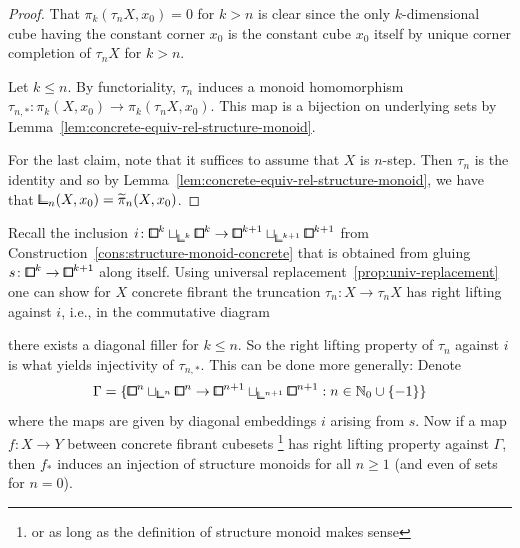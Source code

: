 \begin{proof}
That $\pi_k(\tau_n X,x_0) = 0$ for $k>n$ is clear since the only $k$-dimensional cube having the constant corner $x_0$ is the constant cube $x_0$ itself by unique corner completion of $\tau_n X$ for $k>n$.

Let $k\leq n$.
By functoriality, $\tau_n$ induces a monoid homomorphism $\tau_{n,\ast}\colon\pi_k(X,x_0)\to\pi_k(\tau_n X,x_0)$.
This map is a bijection on underlying sets by Lemma~\ref{lem:concrete-equiv-rel-structure-monoid}.

For the last claim, note that it suffices to assume that $X$ is $n$-step.
Then $\tau_n$ is the identity and so by Lemma~\ref{lem:concrete-equiv-rel-structure-monoid},
we have that $\bbcor_n(X,x_0) = \tilde{\pi}_n(X,x_0)$.
\end{proof}

\begin{remark}\label{rem:nil-cofibrations}
Recall the inclusion
$i\colon{\bbox}^k\sqcup_{{\bbcor}^k}{\bbox}^k\to{\bbox}^{k+1}\sqcup_{{\bbcor}^{k+1}}{\bbox}^{k+1}$
from Construction~\ref{cons:structure-monoid-concrete} that is
obtained from gluing $s\colon{\bbox}^k\to{\bbox}^{k+1}$ along itself.
Using universal replacement~\ref{prop:univ-replacement} one can show for $X$ concrete fibrant
the truncation $\tau_n\colon X\to\tau_n X$ has right lifting against $i$, i.e.,
in the commutative diagram
\begin{center}
\end{center}
there exists a diagonal filler for $k\leq n$.
So the right lifting property of $\tau_n$ against $i$ is what yields injectivity of $\tau_{n,\ast}$.
This can be done more generally:
Denote
\[
    \Gamma = \{{\bbox}^n\sqcup_{{\bbcor}^n}{\bbox}^n\to{\bbox}^{n+1}\sqcup_{{\bbcor}^{n+1}}{\bbox}^{n+1} : n\in\N_0\cup\{-1\}\}
\]
where the maps are given by diagonal embeddings $i$ arising from $s$.
Now if a map $f\colon X\to Y$ between concrete fibrant cubesets%
\footnote{or as long as the definition of structure monoid makes sense}
has right lifting property against $\Gamma$, then $f_\ast$ induces an injection of structure monoids
for all $n\geq 1$ (and even of sets for $n=0$).
\end{remark}


